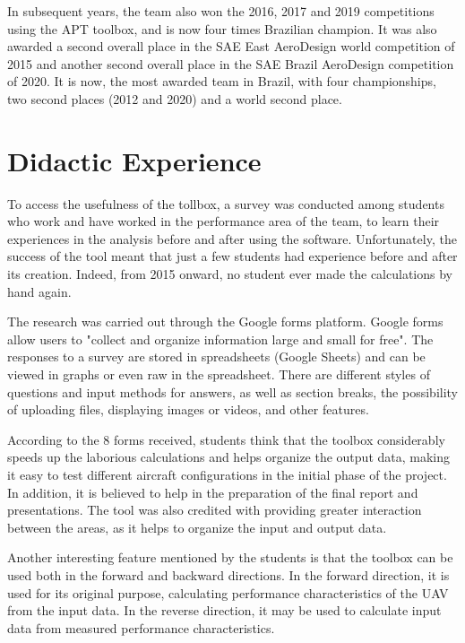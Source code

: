 \documentclass[10pt]{SelfArx} %
\begin{document}
In subsequent years, the team also won the 2016, 2017 and 2019 competitions  using the APT toolbox, and is now four times Brazilian champion. It was also awarded a second overall place in the SAE East AeroDesign world competition of 2015 and another second overall place in the SAE Brazil AeroDesign  competition of 2020. It is now, the most awarded team in Brazil, with four championships, two second places (2012 and 2020) and a world second place. 


\section{Didactic Experience}
To access the usefulness of the tollbox, a survey was conducted among students who work and have worked in the performance area of the team, to learn their experiences in the analysis before and after using the {software}. Unfortunately, the success of the tool meant that just a few students had experience before and after its creation. Indeed, from 2015 onward, no student  ever made the calculations by hand again. 

The research was carried out through the Google forms platform. Google forms allow users to "collect and organize information large and small for free". The responses to a survey are stored in spreadsheets (Google Sheets) and can be viewed in graphs or even raw in the spreadsheet. There are different styles of questions and input methods for answers, as well as section breaks, the possibility of uploading files, displaying images or videos, and other features. 

According to the 8 forms received, students think that the {toolbox} considerably speeds up the laborious calculations and helps organize the output data, making it easy to test different aircraft configurations in the initial phase of the project. In addition, it is believed to help in the preparation of the final report and presentations. The tool was also credited with providing greater interaction between the areas, as it helps to organize the input and output data.
 
Another interesting feature mentioned by the students is that the toolbox can be used both in the forward and  backward directions. In the forward direction, it is used for its original purpose, calculating performance characteristics of the UAV from the input data. In the reverse direction, it may be used to calculate input data from measured performance characteristics. 
\end{document}
